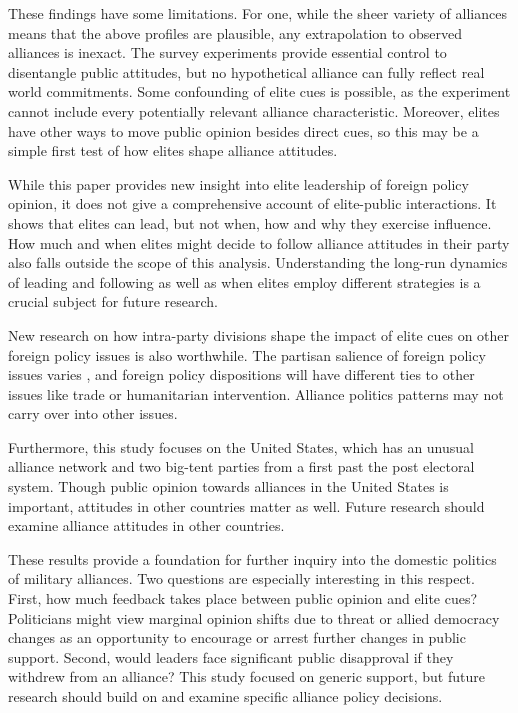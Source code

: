 \documentclass[12pt]{article}
\begin{document}
These findings have some limitations. 
For one, while the sheer variety of alliances means that the above profiles are plausible, any extrapolation to observed alliances is inexact. 
The survey experiments provide essential control to disentangle public attitudes, but no hypothetical alliance can fully reflect real world commitments.
Some confounding of elite cues is possible, as the experiment cannot include every potentially relevant alliance characteristic. 
Moreover, elites have other ways to move public opinion besides direct cues, so this may be a simple first test of how elites shape alliance attitudes. 


While this paper provides new insight into elite leadership of foreign policy opinion, it does not give a comprehensive account of elite-public interactions.
It shows that elites can lead, but not when, how and why they exercise influence. 
How much and when elites might decide to follow alliance attitudes in their party also falls outside the scope of this analysis. 
Understanding the long-run dynamics of leading and following as well as when elites employ different strategies is a crucial subject for future research. 


New research on how intra-party divisions shape the impact of elite cues on other foreign policy issues is also worthwhile. 
The partisan salience of foreign policy issues varies \citep{GuisingerSaunders2017}, and foreign policy dispositions will have different ties to other issues like trade or humanitarian intervention.
Alliance politics patterns may not carry over into other issues.


Furthermore, this study focuses on the United States, which has an unusual alliance network and two big-tent parties from a first past the post electoral system. 
Though public opinion towards alliances in the United States is important, attitudes in other countries matter as well. 
Future research should examine alliance attitudes in other countries. 


These results provide a foundation for further inquiry into the domestic politics of military alliances. 
Two questions are especially interesting in this respect.
First, how much feedback takes place between public opinion and elite cues? 
Politicians might view marginal opinion shifts due to threat or allied democracy changes as an opportunity to encourage or arrest further changes in public support.
Second, would leaders face significant public disapproval if they withdrew from an alliance? 
This study focused on generic support, but future research should build on \citet{TomzWeeks2021} and examine specific alliance policy decisions. 
\end{document}
